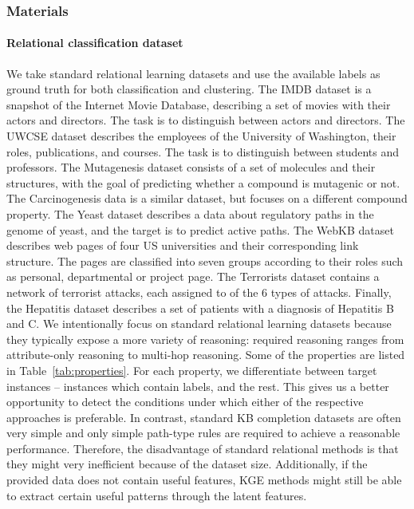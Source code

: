 \subsubsection{Materials}



\paragraph{Relational classification dataset}
We take standard relational learning datasets and use the available labels as ground truth for both classification and clustering.
The IMDB dataset is a snapshot of the Internet Movie Database, describing a set of movies with their actors and directors.
The task is to distinguish between actors and directors.
The UWCSE dataset describes the employees of the University of Washington, their roles, publications, and courses.
The task is to distinguish between students and professors.
The Mutagenesis dataset consists of a set of molecules and their structures, with the goal of predicting whether a compound is mutagenic or not.
The Carcinogenesis data is a similar dataset, but focuses on a different compound property.
The Yeast dataset describes a data about regulatory paths in the genome of yeast, and the target is to predict active paths.
The WebKB dataset describes web pages of four US universities and their corresponding link structure.
The pages are classified into seven groups according to their roles such as personal, departmental or project page.
The Terrorists dataset contains a network of terrorist attacks, each assigned to of the 6 types of attacks.
Finally, the Hepatitis dataset describes a set of patients with a diagnosis of Hepatitis B and C.
We intentionally focus on standard relational learning datasets because they typically expose a more variety of reasoning: required reasoning ranges from attribute-only reasoning to multi-hop reasoning.
Some of the properties are listed in Table~\ref{tab:properties}.
For each property, we differentiate between target instances -- instances which contain labels, and the rest.
This gives us a better opportunity to detect the conditions under which either of the respective approaches is preferable.
In contrast, standard KB completion datasets are often very simple and  only simple path-type rules are required to achieve a reasonable performance.
Therefore, the disadvantage of standard relational methods is that they might very inefficient because of the dataset size.
Additionally, if the provided data does not contain useful features, KGE methods might still be able to extract certain useful patterns through the latent features.



